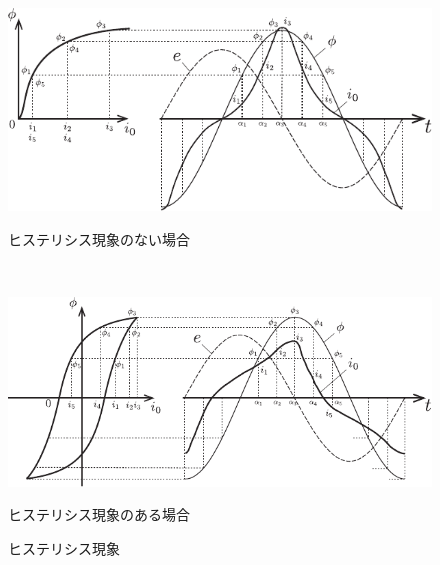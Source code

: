 \begin{figure}[h]
  \begin{minipage}[c]{0.5\hsize}
    \centering
    \includegraphics[scale=1.2]{fig/hizumi_a.pdf} 
    \caption{ヒステリシス現象のない場合}
  \end{minipage}\\
  \begin{minipage}[c]{0.5\hsize}
    \centering
    \includegraphics[scale=1.2]{fig/hizumi_b.pdf}
    \caption{ヒステリシス現象のある場合}
  \end{minipage}
  \centering
  \caption{ヒステリシス現象}
   \label{fig:hys:hizumi}
\end{figure}

